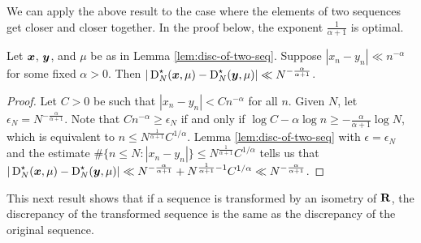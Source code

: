 We can apply the above result to the case where the elements of two sequences 
get closer and closer together. In the proof below, the exponent 
$\frac{1}{\alpha+1}$ is optimal. 

\begin{corollary}\label{cor:close-seq-disc}
Let ${\boldsymbol x}$, ${\boldsymbol y}$, and $\mu$ be as in Lemma \ref{lem:disc-of-two-seq}. Suppose 
$|x_n - y_n| \ll n^{-\alpha}$ for some fixed $\alpha>0$. Then 
$|\operatorname{D}_N^\star({\boldsymbol x},\mu) - \operatorname{D}_N^\star({\boldsymbol y},\mu)| \ll N^{-\frac{\alpha}{\alpha+1}}$. 
\end{corollary}
\begin{proof}
Let $C>0$ be such that $|x_n - y_n| < C n^{-\alpha}$ for all $n$. Given 
$N$, let $\epsilon_N = N^{-\frac{\alpha}{\alpha+1}}$. Note that 
$C n^{-\alpha} \geqslant \epsilon_N$ if and only if 
$\log C - \alpha\log n \geqslant -\frac{\alpha}{\alpha+1} \log N$, which is 
equivalent to $n \leqslant N^{\frac{1}{\alpha+1}} C^{1/\alpha}$. 
Lemma \ref{lem:disc-of-two-seq} with $\epsilon = \epsilon_N$ and the estimate 
$\# \{n\leqslant N : |x_n - y_n|\} \leqslant N^{\frac{1}{\alpha+1}} C^{1/\alpha}$ 
tells us that 
$|\operatorname{D}_N^\star({\boldsymbol x},\mu) - \operatorname{D}_N^\star({\boldsymbol y},\mu)| \ll N^{-\frac{\alpha}{\alpha+1}} + N^{\frac{1}{\alpha+1} - 1} C^{1/\alpha}\ll N^{-\frac{\alpha}{\alpha+1}}$. 
\end{proof}

This next result shows that if a sequence is transformed by an isometry of 
$\mathbf{R}$, the discrepancy of the transformed sequence is the same as the 
discrepancy of the original sequence.

